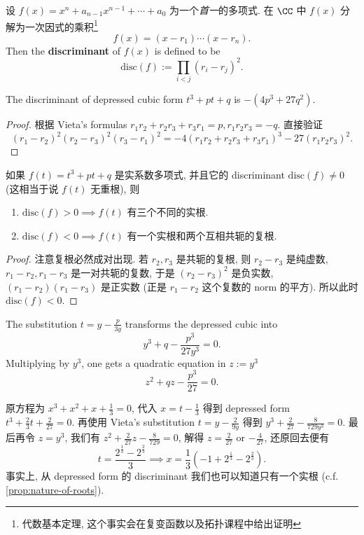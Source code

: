 \begin{defin}[Discriminant]
\label{defin:disc}
设 $f(x) = x^n + a_{n-1}x^{n-1} + \cdots + a_0$ 为一个\emph{首一}的多项式.
在 $\CC$ 中 $f(x)$ 分解为一次因式的乘积\footnote{代数基本定理, 这个事实会在复变函数以及拓扑课程中给出证明}
\[
f(x) = (x - r_1) \cdots (x - r_n).
\]
Then the \textbf{discriminant} of $f(x)$ is defined to be
\[
\mathrm{disc}(f) := \prod_{i < j}(r_i - r_j)^2.
\]

\begin{lem}
\label{lem:depressed-form-disc}
The discriminant of depressed cubic form $t^3 + pt + q$ is $-(4p^3 + 27q^2)$.
\end{lem}

\begin{proof}
根据 Vieta's formulas $r_1r_2 + r_2r_3 + r_3r_1 = p, r_1r_2r_3 = -q$.
直接验证
\[
(r_1 - r_2)^2(r_2 - r_3)^2(r_3 - r_1)^2 =
-4(r_1r_2 + r_2r_3 + r_3r_1)^3  - 27(r_1r_2r_3)^2.
\]
\end{proof}

\begin{prop}
\label{prop:nature-of-roots}
如果 $f(t) = t^3 + pt + q$ 是实系数多项式,
并且它的 discriminant $\mathrm{disc}(f) \ne 0$
(这相当于说 $f(t)$ 无重根), 则
\begin{enumerate}[label={\normalfont(\alph*)}]
\item $\mathrm{disc}(f) > 0 \implies f(t)$ 有三个不同的实根.
\item $\mathrm{disc}(f) < 0 \implies f(t)$ 有一个实根和两个互相共轭的复根.
\end{enumerate}
\end{prop}

\begin{proof}
注意复根必然成对出现. 若 $r_2, r_3$ 是共轭的复根,
则 $r_2 - r_3$ 是纯虚数, $r_1 - r_2, r_1 - r_3$ 是一对共轭的复数,
于是 $(r_2 - r_3)^2$ 是负实数, $(r_1 - r_2)(r_1 - r_3)$ 是正实数
(正是 $r_1 - r_2$ 这个复数的 norm 的平方).
所以此时 $\mathrm{disc}(f) < 0$.
\end{proof}

\begin{prop}
\label{prop:vieta-substitution}
The substitution $t = y - \frac{p}{3y}$ transforms the depressed cubic into
\[
y^3 + q - \frac{p^3}{27y^3} = 0.
\]
Multiplying by $y^3$, one gets a quadratic equation in $z := y^3$
\[
z^2 + qz - \frac{p^3}{27} = 0.
\]
\end{prop}

\begin{soln}
原方程为 $x^3 + x^2 + x + \frac{1}{3} = 0$,
代入 $x = t - \frac{1}{3}$ 得到 depressed form
$t^3 + \frac{2}{3}t + \frac{2}{27} = 0$.
再使用 Vieta's substitution $t = y - \frac{2}{9y}$ 得到
$y^3 + \frac{2}{27} - \frac{8}{729y^3} = 0$.
最后再令 $z = y^3$, 我们有 $z^2 + \frac{2}{27}z - \frac{8}{729} = 0$,
解得 $z = \frac{2}{27}$ or $-\frac{4}{27}$, 还原回去便有
\[
t  = \frac{2^{\frac{1}{3}} - 2^{\frac{2}{3}}}{3} \implies
x =  \boxed{\frac{1}{3}(-1 + 2^{\frac{1}{3}} - 2^{\frac{2}{3}}).}
\]
事实上, 从 depressed form 的 discriminant
我们也可以知道只有一个实根 (c.f. \cref{prop:nature-of-roots}).
\end{soln}
\end{defin}
